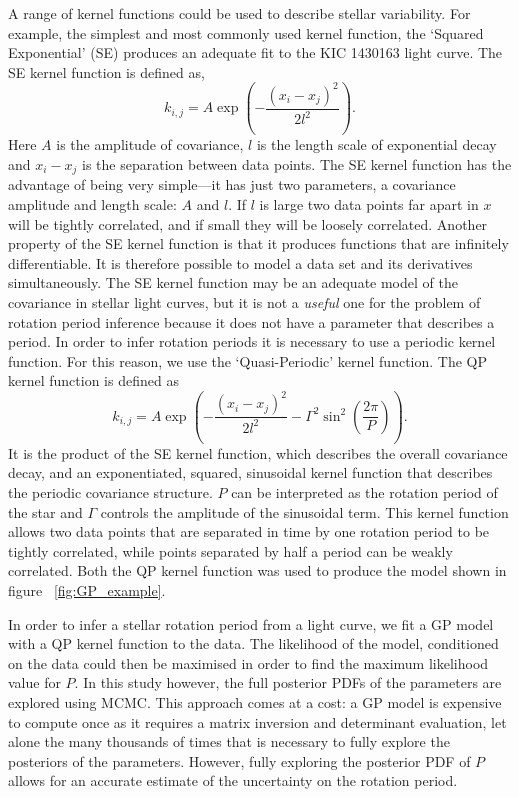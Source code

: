 \documentclass[useAMS, usenatbib, preprint, 12pt]{aastex}
\newcommand{\eg}{{\it e.g.}}
\begin{document}
A range of kernel functions could be used to describe stellar variability.
For example, the simplest and most commonly used kernel function, the `Squared
Exponential' (SE) produces an adequate fit to the KIC 1430163 light curve.
The SE kernel function is defined as,
\begin{equation}
k_{i,j} = A \exp \left(-\frac{(x_i - x_j)^2}{2l^2} \right).
\end{equation}
\label{eq:SE}
Here $A$ is the amplitude of covariance, $l$ is the length scale of
exponential decay and $x_i-x_j$ is the separation between data points.
The SE kernel function has the advantage of being very simple---it has just
two parameters, a covariance amplitude and length scale: $A$ and $l$.
If $l$ is large two data points far apart in $x$ will be tightly correlated,
and if small they will be loosely correlated.
Another property of the SE kernel function is that it produces functions that
are infinitely differentiable.
It is therefore possible to model a data set and its derivatives
simultaneously.
The SE kernel function may be an adequate model of the covariance in stellar
light curves, but it is not a {\it useful} one for the problem of rotation
period inference because it does not have a parameter that describes a period.
In order to infer rotation periods it is necessary to use a periodic kernel
function.
For this reason, we use the `Quasi-Periodic' kernel function.
The QP kernel function is defined as
\begin{equation}
k_{i,j} = A \exp \left(-\frac{(x_i - x_j)^2}{2l^2} -
\Gamma^2 \sin^2(\frac{2\pi}{P}) \right).
\end{equation}
\label{eq:QP}
It is the product of the SE kernel function, which describes the overall
covariance decay, and an exponentiated, squared, sinusoidal kernel function
that describes the periodic covariance structure.
$P$ can be interpreted as the rotation period of the star and $\Gamma$
controls the amplitude of the sinusoidal term.
This kernel function allows two data points that are separated in time by one
rotation period to be tightly correlated, while points separated by half a
period can be weakly correlated.
Both the QP kernel function was used to produce the model shown in figure
~\ref{fig:GP_example}.

In order to infer a stellar rotation period from a light curve, we fit a GP
model with a QP kernel function to the data.
The likelihood of the model, conditioned on the data could then be maximised
in order to find the maximum likelihood value for $P$.
In this study however, the full posterior PDFs of the parameters are explored
using MCMC.
This approach comes at a cost: a GP model is expensive to compute once as it
requires a matrix inversion and determinant evaluation, let alone the many
thousands of times that is necessary to fully explore the posteriors of the
parameters.
However, fully exploring the posterior PDF of $P$ allows for an accurate
estimate of the uncertainty on the rotation period.
\end{document}
